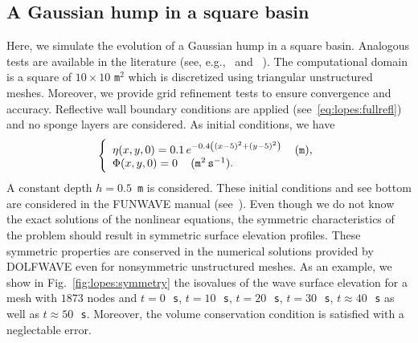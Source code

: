 \subsection{A Gaussian hump in a square basin}
Here, we simulate the evolution of a Gaussian hump in a
square basin. Analogous tests are available in the
literature (see, e.g.,~\cite{WeiKirby1995} and
~\cite{WooLiu2004a}).
 The computational domain is a square
of \(10\times 10\) {\tt m}\(^2\) which is discretized using
triangular unstructured meshes.
Moreover, we provide grid
refinement tests to ensure convergence and accuracy.
Reflective wall boundary conditions are applied
(see~\eqref{eq:lopes:fullrefl}) and
no sponge layers are considered.
As initial conditions, we have
\begin{equation}
\left\{
\begin{array}{l}
\eta(x,y,0)=0.1\,e^{-0.4\left((x-5)^2+(y-5)^2\right)}\,\quad
{(\tt m)},\\
\Phi(x,y,0)=0\,\quad ({\tt m}^2\,{\tt s}^{-1}).
\end{array}
\right.
\end{equation}
A constant depth \(h=0.5\)~{\tt m} is considered.  These
initial conditions and see bottom are considered in the
FUNWAVE manual (see~\cite{Kirby1998}).  Even though we do
not know the exact solutions of the nonlinear equations, the
symmetric characteristics of the problem should result in
symmetric surface elevation profiles.  These symmetric
properties are conserved in the numerical solutions provided
by DOLFWAVE even for
nonsymmetric unstructured meshes.
As an example,  we show in Fig.~\ref{fig:lopes:symmetry}
the isovalues of the wave surface elevation for a mesh with
$1873$ nodes and $t=0$\,~{\tt s}, $t=10$\,~{\tt s},
$t=20$\,~{\tt s}, $t=30$\,~{\tt s}, $t\approx 40$\,~{\tt s}
as well as $t\approx 50$\,~{\tt s}.
Moreover, the volume  conservation condition is satisfied
with a neglectable error.


